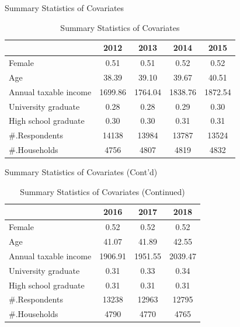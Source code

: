 \documentclass[
  ignorenonframetext,
]{beamer}
\begin{document}
\begin{frame}{Summary Statistics of Covariates}
\protect\hypertarget{summary-statistics-of-covariates}{}

\begin{table}

\caption{\label{tab:kableSummaryCovariate}Summary Statistics of Covariates}
\centering
\begin{tabular}[t]{lcccc}
\toprule
 & 2012 & 2013 & 2014 & 2015\\
\midrule
Female & 0.51 & 0.51 & 0.52 & 0.52\\
Age & 38.39 & 39.10 & 39.67 & 40.51\\
Annual taxable income & 1699.86 & 1764.04 & 1838.76 & 1872.54\\
University graduate & 0.28 & 0.28 & 0.29 & 0.30\\
High school graduate & 0.30 & 0.30 & 0.31 & 0.31\\
\#.Respondents & 14138 & 13984 & 13787 & 13524\\
\#.Households & 4756 & 4807 & 4819 & 4832\\
\bottomrule
\end{tabular}
\end{table}

\end{frame}

\begin{frame}{Summary Statistics of Covariates (Cont'd)}
\protect\hypertarget{summary-statistics-of-covariates-contd}{}

\begin{table}

\caption{\label{tab:kableSummaryCovariate2}Summary Statistics of Covariates (Continued)}
\centering
\begin{tabular}[t]{lccc}
\toprule
 & 2016 & 2017 & 2018\\
\midrule
Female & 0.52 & 0.52 & 0.52\\
Age & 41.07 & 41.89 & 42.55\\
Annual taxable income & 1906.91 & 1951.55 & 2039.47\\
University graduate & 0.31 & 0.33 & 0.34\\
High school graduate & 0.31 & 0.31 & 0.31\\
\#.Respondents & 13238 & 12963 & 12795\\
\#.Households & 4790 & 4770 & 4765\\
\bottomrule
\end{tabular}
\end{table}

\end{frame}
\end{document}
